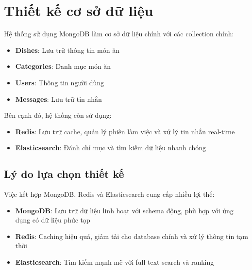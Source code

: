 \section{Thiết kế cơ sở dữ liệu}
Hệ thống sử dụng MongoDB làm cơ sở dữ liệu chính với các collection chính:

\begin{itemize}
    \item \textbf{Dishes}: Lưu trữ thông tin món ăn
    \item \textbf{Categories}: Danh mục món ăn
    \item \textbf{Users}: Thông tin người dùng
    \item \textbf{Messages}: Lưu trữ tin nhắn
\end{itemize}

Bên cạnh đó, hệ thống còn sử dụng:
\begin{itemize}
    \item \textbf{Redis}: Lưu trữ cache, quản lý phiên làm việc và xử lý tin nhắn real-time
    \item \textbf{Elasticsearch}: Đánh chỉ mục và tìm kiếm dữ liệu nhanh chóng
\end{itemize}

\subsection{Lý do lựa chọn thiết kế}
Việc kết hợp MongoDB, Redis và Elasticsearch cung cấp nhiều lợi thế:
\begin{itemize}
    \item \textbf{MongoDB}: Lưu trữ dữ liệu linh hoạt với schema động, phù hợp với ứng dụng có dữ liệu phức tạp
    \item \textbf{Redis}: Caching hiệu quả, giảm tải cho database chính và xử lý thông tin tạm thời
    \item \textbf{Elasticsearch}: Tìm kiếm mạnh mẽ với full-text search và ranking
\end{itemize}
